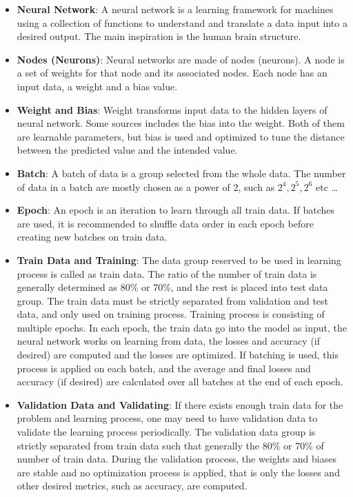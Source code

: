 \begin{itemize}
  
    \item \textbf{Neural Network}: A neural network is a learning framework for machines using a collection of functions to understand and translate a data input into a desired output. The main inspiration is the human brain structure.
  
    \item \textbf{Nodes (Neurons)}: Neural networks are made of nodes (neurons). A node is a set of weights for that node and its associated nodes. Each node has an input data, a weight and a bias value.
  
    \item \textbf{Weight and Bias}: Weight transforms input data to the hidden layers of neural network. Some sources includes the bias into the weight. Both of them are learnable parameters, but bias is used and optimized to tune the distance between the predicted value and the intended value.

    \item \textbf{Batch}: A batch of data is a group selected from the whole data. The number of data in a batch are mostly chosen as a power of 2, such as $2^4, 2^5, 2^6$ etc \dots
  
    \item \textbf{Epoch}: An epoch is an iteration to learn through all train data. If batches are used, it is recommended to shuffle data order in each epoch before creating new batches on train data.
  
    \item \textbf{Train Data and Training}: The data group reserved to be used in learning process is called as train data. The ratio of the number of train data is generally determined as 80\% or 70\%, and the rest is placed into test data group. The train data must be strictly separated from validation and test data, and only used on training process. Training process is consisting of multiple epochs. In each epoch, the train data go into the model as input, the neural network works on learning from data, the losses and accuracy (if desired) are computed and the losses are optimized. If batching is used, this process is applied on each batch, and the average and final losses and accuracy (if desired) are calculated over all batches at the end of each epoch.
  
    \item \textbf{Validation Data and Validating}: If there exists enough train data for the problem and learning process, one may need to have validation data to validate the learning process periodically. The validation data group is strictly separated from train data such that generally the 80\% or 70\% of number of train data. During the validation process, the weights and biases are stable and no optimization process is applied, that is only the losses and other desired metrics, such as accuracy, are computed.
  

\end{itemize}
